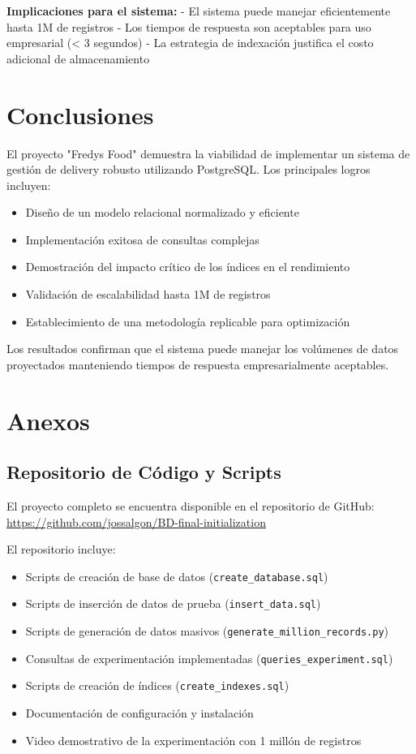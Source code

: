 \documentclass[12pt,a4paper]{article}
\begin{document}
\textbf{Implicaciones para el sistema:}
- El sistema puede manejar eficientemente hasta 1M de registros
- Los tiempos de respuesta son aceptables para uso empresarial (< 3 segundos)
- La estrategia de indexación justifica el costo adicional de almacenamiento

\section{Conclusiones}

El proyecto "Fredys Food" demuestra la viabilidad de implementar un sistema de gestión de delivery robusto utilizando PostgreSQL. Los principales logros incluyen:

\begin{itemize}
    \item Diseño de un modelo relacional normalizado y eficiente
    \item Implementación exitosa de consultas complejas
    \item Demostración del impacto crítico de los índices en el rendimiento
    \item Validación de escalabilidad hasta 1M de registros
    \item Establecimiento de una metodología replicable para optimización
\end{itemize}

Los resultados confirman que el sistema puede manejar los volúmenes de datos proyectados manteniendo tiempos de respuesta empresarialmente aceptables.

\section{Anexos}

\subsection{Repositorio de Código y Scripts}

El proyecto completo se encuentra disponible en el repositorio de GitHub:
\url{https://github.com/jossalgon/BD-final-initialization}

El repositorio incluye:
\begin{itemize}
    \item Scripts de creación de base de datos (\texttt{create\_database.sql})
    \item Scripts de inserción de datos de prueba (\texttt{insert\_data.sql})
    \item Scripts de generación de datos masivos (\texttt{generate\_million\_records.py})
    \item Consultas de experimentación implementadas (\texttt{queries\_experiment.sql})
    \item Scripts de creación de índices (\texttt{create\_indexes.sql})
    \item Documentación de configuración y instalación
    \item Video demostrativo de la experimentación con 1 millón de registros
\end{itemize}
\end{document}
